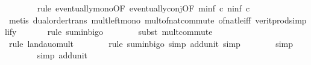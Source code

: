 \begin{isabellebody}
\ \ \ \ \ \ \isamarkupfalse%
\ {\isacharparenleft}{\kern0pt}rule\ eventually{\isacharunderscore}{\kern0pt}mono{\isacharbrackleft}{\kern0pt}OF\ eventually{\isacharunderscore}{\kern0pt}conj{\isacharbrackleft}{\kern0pt}OF\ m{\isacharunderscore}{\kern0pt}inf{\isacharbrackleft}{\kern0pt}\ c{\isacharequal}{\kern0pt}{\isachardoublequoteopen}{}{\isachardoublequoteclose}{\isacharbrackright}{\kern0pt}\ n{\isacharunderscore}{\kern0pt}inf{\isacharbrackleft}{\kern0pt}\ c{\isacharequal}{\kern0pt}{\isachardoublequoteopen}{}{\isachardoublequoteclose}{\isacharbrackright}{\kern0pt}{\isacharbrackright}{\kern0pt}{\isacharbrackright}{\kern0pt}{\isacharparenright}{\kern0pt}\isanewline
\ \ \ \ \ \ \isamarkupfalse%
\ {\isacharparenleft}{\kern0pt}metis\ dual{\isacharunderscore}{\kern0pt}order{\isachardot}{\kern0pt}trans\ mult{\isacharunderscore}{\kern0pt}left{\isacharunderscore}{\kern0pt}mono\ mult{\isacharunderscore}{\kern0pt}of{\isacharunderscore}{\kern0pt}nat{\isacharunderscore}{\kern0pt}commute\ of{\isacharunderscore}{\kern0pt}nat{\isacharunderscore}{\kern0pt}{}{\isacharunderscore}{\kern0pt}le{\isacharunderscore}{\kern0pt}iff\ verit{\isacharunderscore}{\kern0pt}prod{\isacharunderscore}{\kern0pt}simplify{\isacharparenleft}{\kern0pt}{}{\isacharparenright}{\kern0pt}{\isacharparenright}{\kern0pt}\isanewline
\ \ \ \ \ \isamarkupfalse%
\ {\isacharparenleft}{\kern0pt}rule\ sum{\isacharunderscore}{\kern0pt}in{\isacharunderscore}{\kern0pt}bigo{\isacharparenright}{\kern0pt}\isanewline
\ \ \ \ \ \ \isamarkupfalse%
\ {\isacharparenleft}{\kern0pt}subst\ mult{\isachardot}{\kern0pt}commute{\isacharparenright}{\kern0pt}\isanewline
\ \ \ \ \ \ \isamarkupfalse%
\ {\isacharparenleft}{\kern0pt}rule\ landau{\isacharunderscore}{\kern0pt}o{\isachardot}{\kern0pt}mult{\isacharparenright}{\kern0pt}\isanewline
\ \ \ \ \ \ \isamarkupfalse%
\ {\isacharparenleft}{\kern0pt}rule\ sum{\isacharunderscore}{\kern0pt}in{\isacharunderscore}{\kern0pt}bigo{\isacharcomma}{\kern0pt}\ simp\ add{\isacharcolon}{\kern0pt}unit{\isacharunderscore}{\kern0pt}{}{\isacharcomma}{\kern0pt}\ simp{\isacharparenright}{\kern0pt}\isanewline
\ \ \ \ \ \ \isamarkupfalse%
\ simp\isanewline
\ \ \ \ \ \ \isamarkupfalse%
\ {\isacharparenleft}{\kern0pt}simp\ add{\isacharcolon}{\kern0pt}unit{\isacharunderscore}{\kern0pt}{}{\isacharparenright}{\kern0pt}\isanewline
\ \ \ \ \isamarkupfalse%

\end{isabellebody}
